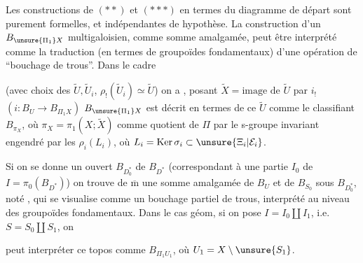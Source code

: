 Les constructions de $(**)$ et $(***)$ en termes du diagramme de départ
sont purement formelles, et indépendantes de  hypothèse.
La construction d'un $B_{\unsure{\Pi_1}X}$ multigaloisien, comme somme amalgamée, peut être interprété comme la traduction (en termes de groupoïdes fondamentaux) d'une opération de ``bouchage de trous''.
 Dans le cadre 


(avec choix des $\widetilde U,\widetilde U_i$, $\rho_!(\widetilde U_i)\simeq\widetilde U$) on a
,
posant $\widetilde X=\text{image de }\widetilde U$ par $i_!$ $(i:B_U\longrightarrow B_{\Pi_1 X})$ $B_{\unsure{\Pi_1}X}$ est décrit en termes de ce $\widetilde U$ comme le  classifiant $B_{\pi_X}$, où $\pi_X=\pi_1(X;\widetilde X)$   comme quotient de $\Pi$ par le s-groupe invariant engendré par les $\rho_i(L_i)$, où $L_i=\operatorname{Ker}\sigma_i\subset\unsure{\Xi_i|\mathcal E_i}$.

Si on se donne un  ouvert $B_{D_0^*}$ de $B_{D^*}$ (correspondant à une partie $I_0$ de $I=\pi_0(B_{D^*})$) on trouve de $\overline{\mathrm m}$ une somme amalgamée de $B_U$ et de $B_{S_0}$ sous $B_{D_0^*}$, noté  , qui se visualise comme un bouchage partiel de trous, interprété au niveau des groupoïdes fondamentaux. Dans le cas géom, si on pose $I=I_0\amalg I_1$, i.e. $S=S_0\amalg S_1$, on


peut interpréter ce topos comme $B_{\Pi_1 U_1}$, où $U_1=X\setminus\unsure{S_1}$. 

